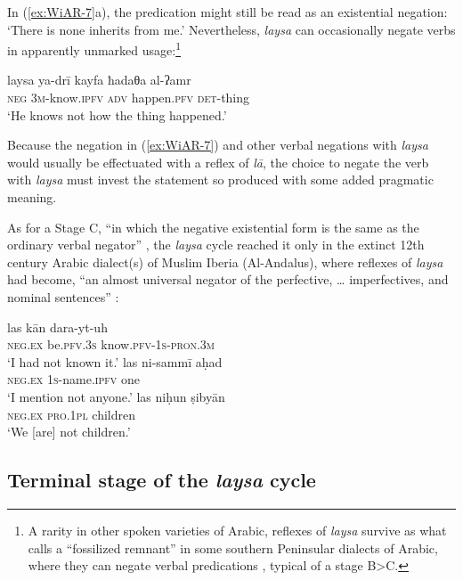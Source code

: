 \documentclass[output=paper,colorlinks,citecolor=brown]{langscibook}
\begin{document}
In (\ref{ex:WiAR-7}a), the predication might still be read as an existential negation: ‘There is none inherits from me.’ Nevertheless, \textit{laysa} can occasionally negate verbs in apparently unmarked usage:\footnote{A rarity in other spoken varieties of Arabic, reflexes of \textit{laysa} survive as what \citet[26]{holes2006a} calls a “fossilized remnant” in some southern Peninsular dialects of Arabic, where they can negate verbal predications \citep[142--144]{al-azraqi1998a}, typical of a stage B>C.}

\ea \label{ex:WiAR-8}
	\gll laysa ya-drī kayfa ħadaθa al-ʔamr \\
	\textsc{neg} \textsc{3m}-know.\textsc{ipfv} \textsc{adv} happen.\textsc{pfv} \textsc{det}-thing\\
	\glt ‘He knows not how the thing happened.’ \citep[28]{kanafani2006a}
\z

Because the negation in (\ref{ex:WiAR-7}) and other verbal negations with \textit{laysa} would usually be effectuated with a reflex of \textit{lā}, the choice to negate the verb with \textit{laysa} must invest the statement so produced with some added pragmatic meaning.

As for a Stage C, “in which the negative existential form is the same as the ordinary verbal negator” \citep[11]{Croft1991}, the \textit{laysa} cycle reached it only in the extinct 12th century Arabic dialect(s) of Muslim Iberia (Al-Andalus), where reflexes of \textit{laysa} had become, “an almost universal negator of the perfective, … imperfectives, and nominal sentences” \citep{corriente2013a}:

\ea \label{ex:WiAR-9}
  \ea
  	\gll las kān dara-yt-uh\\
  	\textsc{neg.ex} be.\textsc{pfv.3s} know.\textsc{pfv-1s-pron.3m}\\
  	\glt ‘I had not known it.’ \citep[126]{corriente2013a}
  \ex
  	\gll las ni-sammī aḥad\\
  	\textsc{neg.ex} \textsc{1s}-name.\textsc{ipfv} one\\
    \glt ‘I mention not anyone.’ \citep[126]{corriente2013a}
  \ex
  	\gll las niḥun ṣibyān\\
  	\textsc{neg.ex} \textsc{pro.1pl} children\\
  	\glt ‘We [are] not children.’ \citep[126]{corriente2013a}
\z \z

\subsection{Terminal stage of the \textit{laysa} cycle} \label{s:WiAR-2.4}
\end{document}
